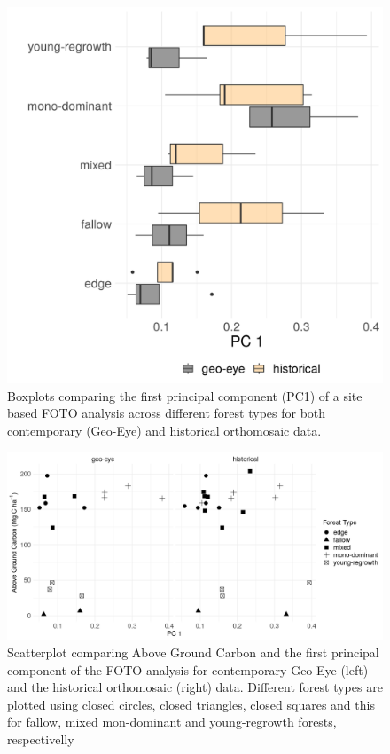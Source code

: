 \documentclass[landscape]{article}
\begin{document}
\begin{figure}

{\centering \includegraphics[width=14.58in,height=0.5\textheight]{./figures/foto_bplot_psp} 

}

\caption{Boxplots comparing the first principal component (PC1) of a site based FOTO analysis across different forest types for both contemporary (Geo-Eye) and historical orthomosaic data.}\label{fig:unnamed-chunk-6}
\end{figure}

\begin{figure}

{\centering \includegraphics[width=0.75\linewidth]{./figures/foto_pc1_agc} 

}

\caption{Scatterplot comparing Above Ground Carbon and the first principal component of the FOTO analysis for contemporary Geo-Eye (left) and the historical orthomosaic (right) data. Different forest types are plotted using closed circles, closed triangles, closed squares and this for fallow, mixed mon-dominant and young-regrowth forests, respectivelly }\label{fig:unnamed-chunk-7}
\end{figure}
\end{document}
